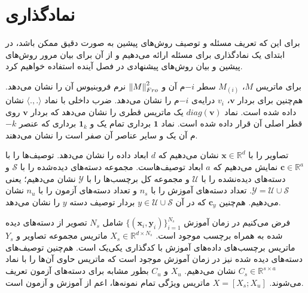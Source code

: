 \section{نماد‌گذاری}\label{notaion}
برای این که تعریف مسئله و  توصیف روش‌های پیشین به صورت دقیق ممکن باشد، در ابتدای یک نمادگذاری برای مسئله ارائه می‌دهیم و از آن برای بیان مرور روش‌های پیشین و بیان روش‌های پیشنهادی در فصل آینده استفاده خواهیم کرد.

برای ماتریس $M$،    
$M_{(i)}$
 سطر $-i$م آن و 
$\left \lVert M \right \rVert_{Fro}^2$
نرم فروبنیوس آن را نشان می‌دهد. هم‌چنین برای بردار
 $\mathbf{v}$،
 $v_i$ 
 درایه‌ی $-i$م را نشان می‌دهد.
    ضرب داخلی با نماد  
$\langle ., . \rangle $
     نشان داده شده است. نماد
$diag(\mathbf{v})$
یک ماتریس قطری  را نشان می‌دهد که بردار $\mathbf{v} $ روی قطر اصلی آن قرار داده شده است. نماد $\mathbf{1}$ برداری تمام یک و $\mathbf{1}_k$ برداری که عنصر $-k$م آن یک و سایر عناصر آن صفر است را نشان می‌دهند. 

 تصاویر را با
 $\mathbf{x}  \in \mathbb{R}^d$
 نشان می‌دهیم که $d$ ابعاد داده را نشان می‌دهد. توصیف‌ها را با
 $ \mathbf{c}  \in \mathbb{R}^a$
 نمایش می‌دهیم که  $a$ ابعاد توصیف‌هاست. مجموعه دسته‌های دیده‌شده را با  $ \mathcal{S}$ و دسته‌های دیده‌نشده را با $ \mathcal{U}$ و مجموعه کل برچسب‌ها را با $ \mathcal{Y}$
 نشان می‌دهیم؛ یعنی
 $ \mathcal{Y} =  \mathcal{U} \cup \mathcal{S} $.
 تعداد دسته‌های آموزش را با $n_s$ و تعداد دسته‌های آزمون را با $n_u$ نشان می‌دهیم.
هم‌چنین   $\mathbf{c}_y $ که در آن    $ y \in \mathcal{U} \cup \mathcal{S} $ بردار توصیف دسته $y$ را نشان می‌دهد.

    فرض می‌کنیم در زمان آموزش 
    $ \{ (\mathbf{x}_i, \mathbf{y}_i) \}_{i=1}^{N_s} $
     شامل $N_s$
     تصویر از دسته‌های دیده شده به همراه برچسب  موجود است.
     $X_s \in \mathbb{R}^{d \times N_s }$
  ماتریس مجموعه تصاویر و $Y_s$ ماتریس برچسب‌های داده‌های آموزش با کدگذاری یکی‌یک
   است.  هم‌چنین توصیف‌های دسته‌های دیده شده
 نیز در زمان آموزش موجود است که ماتریس حاوی آن‌ها را با نماد   $C_s \in \mathbb{R}^{s \times a}$ نشان می‌دهیم. $X_u$ و $C_u$ بطور مشابه برای دسته‌های آزمون تعریف می‌شوند.
$ X = [X_s;X_u]$
ماتریس ویژگی تمام نمونه‌ها، اعم از آموزش و آزمون است.

